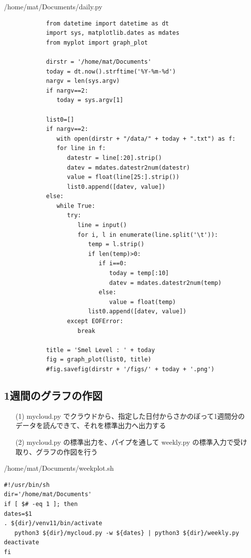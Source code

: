 \documentclass[12pt,a4j]{jsbook}
\begin{document}
\begin{spacing}{0.87}
\begin{itembox}[l]{/home/mat/Documents/daily.py}
\begin{verbatim}
			from datetime import datetime as dt
			import sys, matplotlib.dates as mdates
			from myplot import graph_plot

			dirstr = '/home/mat/Documents'
			today = dt.now().strftime('%Y-%m-%d')
			nargv = len(sys.argv)
			if nargv==2:
			   today = sys.argv[1]

			list0=[]
			if nargv==2:
			   with open(dirstr + "/data/" + today + ".txt") as f:
			   for line in f:
			      datestr = line[:20].strip()
			      datev = mdates.datestr2num(datestr)
			      value = float(line[25:].strip())
			      list0.append([datev, value])
			else:
			   while True:
			      try:
			         line = input()
			         for i, l in enumerate(line.split('\t')):
			            temp = l.strip()
			            if len(temp)>0:
			               if i==0:
			                  today = temp[:10]
			                  datev = mdates.datestr2num(temp)
			               else:
			                  value = float(temp)
			            list0.append([datev, value])
			      except EOFError:
			         break

			title = 'Smel Level : ' + today
			fig = graph_plot(list0, title)
			#fig.savefig(dirstr + '/figs/' + today + '.png')
\end{verbatim}
\end{itembox}
\end{spacing}

\subsection{1週間のグラフの作図}

\begin{enumerate}
	\item[(1)] mycloud.py でクラウドから、指定した日付からさかのぼって1週間分のデータを読んできて、それを標準出力へ出力する
	\item[(2)] mycloud.py の標準出力を、パイプを通して weekly.py の標準入力で受け取り、グラフの作図を行う
\end{enumerate}

\begin{spacing}{0.95}
\begin{itembox}[l]{/home/mat/Documents/weekplot.sh}
\begin{verbatim}
#!/usr/bin/sh
dir='/home/mat/Documents'
if [ $# -eq 1 ]; then
dates=$1
. ${dir}/venv11/bin/activate
   python3 ${dir}/mycloud.py -w ${dates} | python3 ${dir}/weekly.py
deactivate
fi
\end{verbatim}
\end{itembox}
\end{spacing}
\end{document}
